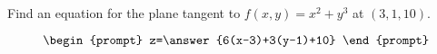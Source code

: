 \documentclass{ximera}
\author{David Guichard \and Neal Koblitz \and H. Jerome Keisler \and Albert Scheller \and Barry Balof \and Mike Wills \and Matthew Carr}
\begin{document}
\begin{exercise}




Find an equation for the plane tangent to $f(x,y)=x^2+y^3$ at $(3,1,10)$.

\[
\begin{prompt}
z=\answer{6(x-3)+3(y-1)+10}
\end{prompt}
\]

\end{exercise}
\end{document}
